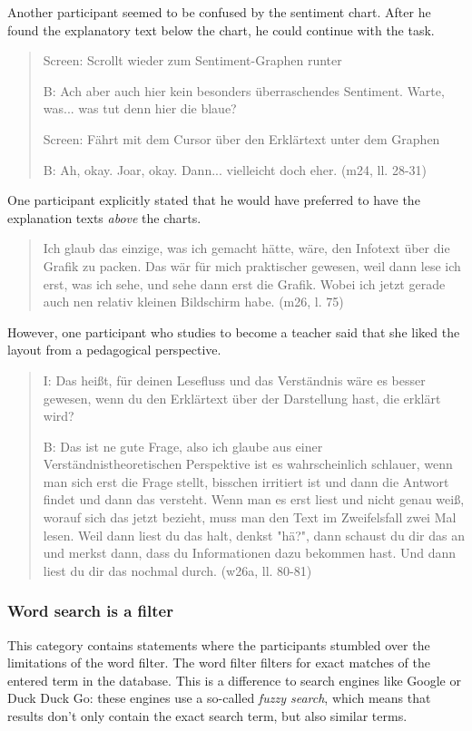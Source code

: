 Another participant seemed to be confused by the sentiment chart. After he found the explanatory text below the chart, he could continue with the task.

\begin{quote}
    Screen: Scrollt wieder zum Sentiment-Graphen runter
    
    B: Ach aber auch hier kein besonders überraschendes Sentiment. Warte, was... was tut denn hier die blaue?

    Screen: Fährt mit dem Cursor über den Erklärtext unter dem Graphen
    
    B: Ah, okay. Joar, okay. Dann... vielleicht doch eher. (m24, ll. 28-31) 
\end{quote}

One participant explicitly stated that he would have preferred to have the explanation texts \emph{above} the charts.

\begin{quote}
    Ich glaub das einzige, was ich gemacht hätte, wäre, den Infotext über die Grafik zu packen. Das wär für mich praktischer gewesen, weil dann lese ich erst, was ich sehe, und sehe dann erst die Grafik. Wobei ich jetzt gerade auch nen relativ kleinen Bildschirm habe. (m26, l. 75)
\end{quote}

However, one participant who studies to become a teacher said that she liked the layout from a pedagogical perspective.

\begin{quote}
    I: Das heißt, für deinen Lesefluss und das Verständnis wäre es besser gewesen, wenn du den Erklärtext über der Darstellung hast, die erklärt wird?

    B: Das ist ne gute Frage, also ich glaube aus einer Verständnistheoretischen Perspektive ist es wahrscheinlich schlauer, wenn man sich erst die Frage stellt, bisschen irritiert ist und dann die Antwort findet und dann das versteht. Wenn man es erst liest und nicht genau weiß, worauf sich das jetzt bezieht, muss man den Text im Zweifelsfall zwei Mal lesen. Weil dann liest du das halt, denkst "hä?", dann schaust du dir das an und merkst dann, dass du Informationen dazu bekommen hast. Und dann liest du dir das nochmal durch. (w26a, ll. 80-81)
\end{quote}

\subsubsection*{Word search is a filter}
This category contains statements where the participants stumbled over the limitations of the word filter. The word filter filters for exact matches of the entered term in the database. This is a difference to search engines like Google or Duck Duck Go: these engines use a so-called \emph{fuzzy search}, which means that results don't only contain the exact search term, but also similar terms.

